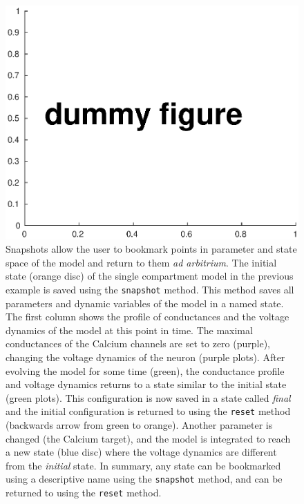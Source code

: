 \documentclass{frontiersSCNS} %
\begin{document}
\begin{figure}[!htb]
	\centering
	\includegraphics[width=1.0\linewidth]{gfx/figure_snapshot}
	\caption{Snapshots allow the user to bookmark points in parameter and state space of the model and return to them \textit{ad arbitrium}. The initial state (orange disc) of the single compartment model in the previous example is saved using the \texttt{snapshot} method. This method saves all parameters and dynamic variables of the model in a named state. The first column shows the profile of conductances and the voltage dynamics of the model at this point in time. The maximal conductances of the Calcium channels are set to zero (purple), changing the voltage dynamics of the neuron (purple plots). After evolving the model for some time (green), the conductance profile and voltage dynamics returns to a state similar to the initial state (green plots). This configuration is now saved in a state called \textit{final} and the initial configuration is returned to using the \texttt{reset} method (backwards arrow from green to orange). Another parameter is changed (the Calcium target), and the model is integrated to reach a new state (blue disc) where the voltage dynamics are different from the \textit{initial} state. In summary, any state can be bookmarked using a descriptive name using the \texttt{snapshot} method, and can be returned to using the \texttt{reset} method.}
	\label{fig:figuresnapshot}
\end{figure}
\end{document}
